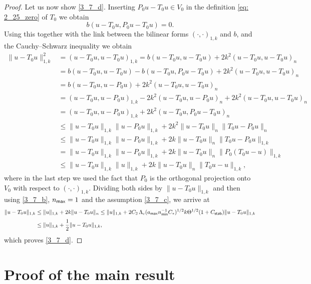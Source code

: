 \documentclass[numbers,webpdf,imaiai]{ima-authoring-template}%
\theoremstyle{thmstyletwo}%
\numberwithin{equation}{section}
\newcommand{\Cstar}{C_{\ast}}
\numberwithin{equation}{section}
\newcommand{\Cstab}{C_{\textup{\textsf{stab}}}}
\newcommand{\amax}{a_{\textup{\textsf{max}}}}
\newcommand{\nmin}{n_{\textup{\textsf{min}}}}
\newcommand{\nmax}{n_{\textup{\textsf{max}}}}
\renewcommand{\kappa}{k}
\begin{document}
{\begin{proof}
Let us now show \eqref{3_7_d}. Inserting $P_0 u - T_0 u \in V_0$ in the definition \eqref{eq: 2_25_zero} of $T_0$
we obtain 
\[
	b(u-T_0 u, P_0 u - T_0 u) = 0.
\]
Using this together with  the link between the bilinear forms $(\cdot,\cdot)_{1,k}$ and $b$, 
and the Cauchy--Schwarz inequality we obtain
\begin{align*}
	\|u - T_0 u\|_{1,k}^2 &= (u - T_0 u, u - T_0 u)_{1,k} 
	= b(u - T_0 u, u - T_0 u) + 2k^2(u - T_0 u, u - T_0 u)_n
	\\[0.5ex]
	&= b(u - T_0 u, u - T_0 u) - b(u - T_0 u, P_0 u - T_0 u) + 2 \kappa^2 (u - T_0 u, u - T_0 u)_n
	\\[0.5ex]
	&= b(u - T_0 u, u - P_0 u) + 2k^2(u - T_0 u, u - T_0 u)_n
	\\[0.5ex]
	&= (u - T_0 u, u - P_0 u)_{1,k} - 2k^2(u - T_0 u, u - P_0 u)_n + 2k^2(u - T_0 u, u - T_0 u)_n
	\\[0.5ex]
	&= (u - T_0 u, u - P_0 u)_{1,k} + 2k^2(u - T_0 u, P_0 u - T_0 u)_n
	\\[0.5ex]
	&\le \|u - T_0 u\|_{1,k}\|u - P_0 u\|_{1,k} + 2k^2\|u - T_0 u\|_n \|T_0 u - P_0 u\|_n
	\\[0.5ex]
	&\le \|u - T_0 u\|_{1,k}\|u - P_0 u\|_{1,k} + 2k\|u - T_0 u\|_n \|T_0 u - P_0 u\|_{1,k}
	\\[0.5ex]
	&= \|u - T_0 u\|_{1,k}\|u - P_0 u\|_{1,k} + 2k\|u - T_0 u\|_n \|P_0(T_0 u - u)\|_{1,k}
	\\[0.5ex]
	&\le \|u - T_0 u\|_{1,k}\|u\|_{1,k} + 2k\|u - T_0 u\|_n \|T_0 u - u\|_{1,k},
\end{align*}
where in the last step we used the fact that $P_0$ is the orthogonal projection onto $V_0$ with respect to $(\cdot,\cdot)_{1,k}$.
Dividing both sides by $\|u - T_0 u\|_{1,k}$ and then using \eqref{3_7_b}, $\nmax = 1$ and the assumption \eqref{3_7_c}, we arrive at 
\begin{align*}
	\|u - T_0 u\|_{1,k} &\le \|u\|_{1,k} + 2k\|u - T_0 u\|_n
	\le \|u\|_{1,k} + 2{C_2}\, \Lambda_c (\amax \nmin^{-1} \Cstar)^{1/2}
	k \Theta^{1/2} (1 + \Cstab)\|u - T_0 u\|_{1,k}
	\\[0.5ex]
	&\le \|u\|_{1,k} + \frac{1}{2}\|u - T_0 u\|_{1,k},
\end{align*}
which proves \eqref{3_7_d}.
\end{proof}

\section{Proof of the main result}\label{sec:proof}

}
\end{document}
